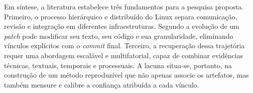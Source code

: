 Em síntese, a literatura estabelece três fundamentos para a pesquisa proposta. Primeiro, o processo hierárquico e distribuído do Linux separa comunicação, revisão e integração em diferentes infraestruturas. Segundo a evolução de um \textit{patch} pode modificar seu texto, seu código e sua granularidade, eliminando vínculos explícitos com o \textit{commit} final. Terceiro, a recuperação dessa trajetória requer uma abordagem escalável e multifatorial, capaz de combinar evidências técnicas, textuais, temporais e processuais. A lacuna situa-se, portanto, na construção de um método reproduzível que não apenas associe os artefatos, mas também mensure e calibre a confiança atribuída a cada vínculo.
